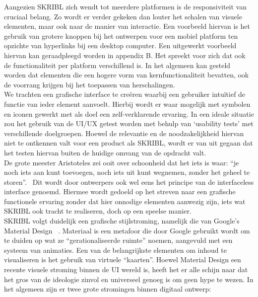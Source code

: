 \documentclass{article}
\begin{document}
Aangezien SKRIBL zich wendt tot meerdere platformen is de responsiviteit van cruciaal belang. Zo wordt er verder gekeken dan louter het schalen van visuele elementen, maar ook naar de manier van interactie. Een voorbeeld hiervan is het gebruik van grotere knoppen bij het ontwerpen voor een mobiel platform ten opzichte van hyperlinks bij een desktop computer. Een uitgewerkt voorbeeld hiervan kan geraadpleegd worden in appendix B. Het spreekt voor zich dat ook de functionaliteit per platform verschillend is. In het algemeen kan gesteld worden dat elementen die een hogere vorm van kernfunctionaliteit bevatten, ook de voorrang krijgen bij het toepassen van herschalingen.
\\

We trachten een grafische interface te creëren waarbij een gebruiker intuïtief de functie van ieder element aanvoelt. Hierbij wordt er waar mogelijk met symbolen en iconen gewerkt met als doel een zelf-verklarende ervaring. In een ideale situatie zou het gebruik van de UI/UX getest worden met behulp van `usability tests' met verschillende doelgroepen. Hoewel de relevantie en de noodzakelijkheid hiervan niet te ontkennen valt voor een product als SKRIBL, wordt er van uit gegaan dat het testen hiervan buiten de huidige omvang van de opdracht valt.
\\

De grote meester Aristoteles zei ooit over schoonheid dat het iets is waar: “je noch iets aan kunt toevoegen, noch iets uit kunt wegnemen, zonder het geheel te storen”.~\cite{gadamer} Dit wordt door ontwerpers ook wel eens het principe van de interfaceless interface genoemd. Hiermee wordt gedoeld op het streven naar een grafische functionele ervaring zonder dat hier onnodige elementen aanwezig zijn, iets wat SKRIBL ook tracht te realiseren, doch op een speelse manier. 
\\

SKRIBL volgt duidelijk een grafische stijlstroming, namelijk die van Google’s Material Design ~\cite{website:Material}. Materiaal is een metafoor die door Google gebruikt wordt om te duiden op wat ze “gerationaliseerde ruimte” noemen, aangevuld met een systeem van animaties. Een van de belangrijkste elementen om inhoud te visualiseren is het gebruik van virtuele “kaarten”. Hoewel Material Design een recente visuele stroming binnen de UI wereld is, heeft het er alle schijn naar dat het gros van de ideologie zinvol en universeel genoeg is om geen hype te wezen. In het algemeen zijn er twee grote stromingen binnen digitaal ontwerp:
\end{document}
